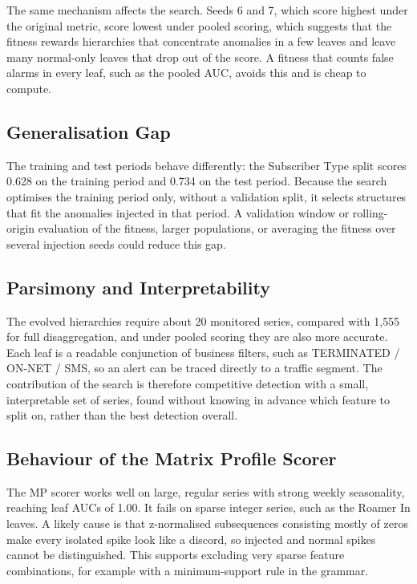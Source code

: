 The same mechanism affects the search.
Seeds 6 and 7, which score highest under the original metric, score lowest under pooled scoring, which suggests that the fitness rewards hierarchies that concentrate anomalies in a few leaves and leave many normal-only leaves that drop out of the score.
A fitness that counts false alarms in every leaf, such as the pooled \ac{AUC}, avoids this and is cheap to compute.

\subsection{Generalisation Gap}

The training and test periods behave differently: the Subscriber Type split scores 0.628 on the training period and 0.734 on the test period.
Because the search optimises the training period only, without a validation split, it selects structures that fit the anomalies injected in that period.
A validation window or rolling-origin evaluation of the fitness, larger populations, or averaging the fitness over several injection seeds could reduce this gap.

\subsection{Parsimony and Interpretability}

The evolved hierarchies require about 20 monitored series, compared with 1{,}555 for full disaggregation, and under pooled scoring they are also more accurate.
Each leaf is a readable conjunction of business filters, such as TERMINATED / ON-NET / SMS, so an alert can be traced directly to a traffic segment.
The contribution of the search is therefore competitive detection with a small, interpretable set of series, found without knowing in advance which feature to split on, rather than the best detection overall.

\subsection{Behaviour of the Matrix Profile Scorer}

The \ac{MP} scorer works well on large, regular series with strong weekly seasonality, reaching leaf \ac{AUC}s of 1.00.
It fails on sparse integer series, such as the Roamer In leaves.
A likely cause is that z-normalised subsequences consisting mostly of zeros make every isolated spike look like a discord, so injected and normal spikes cannot be distinguished.
This supports excluding very sparse feature combinations, for example with a minimum-support rule in the grammar.


